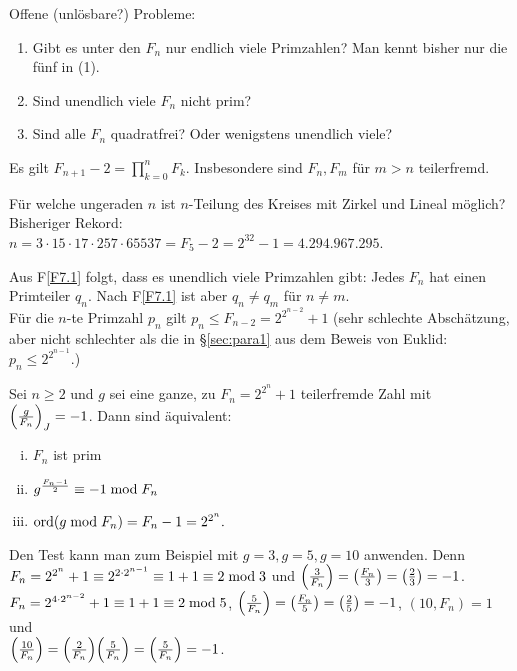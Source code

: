 Offene (unlösbare?) Probleme:
\begin{enumerate}[1)]
	\item Gibt es unter den $F_n$ nur endlich viele Primzahlen? Man kennt bisher nur die fünf in (1).
	\item Sind unendlich viele $F_n$ nicht prim?
	\item Sind alle $F_n$ quadratfrei? Oder wenigstens unendlich viele?
\end{enumerate}

\begin{falko} \label{F7.1}
	Es gilt $F_{n+1} - 2 = \prod_{k=0}^{n} F_k$. Insbesondere sind $F_n,F_m$ für $m > n$ teilerfremd.
\end{falko}

Für welche ungeraden $n$ ist $n$-Teilung des Kreises mit Zirkel und Lineal möglich? Bisheriger Rekord:\\
$n = 3 \cdot 15 \cdot 17 \cdot 257 \cdot 65537 = F_5 - 2 = 2^{32} - 1 = 4.294.967.295$.

	Aus F\ref{F7.1} folgt, dass es unendlich viele Primzahlen gibt: Jedes $F_n$ hat einen Primteiler $q_n$. Nach F\ref{F7.1} ist aber $q_n \neq q_m$ für $n \neq m$. \\
	Für die $n$-te Primzahl $p_n$ gilt $p_n \leq F_{n-2} = 2^{2^{n-2}}+1$ (sehr schlechte Abschätzung, aber nicht schlechter als die in §\ref{sec:para1} aus dem Beweis von Euklid: $p_n \leq 2^{2^{n-1}}$.)
	
\begin{falko} \label{F7.2}
	Sei $n \geq 2$ und $g$ sei eine ganze, zu $F_n = 2^{2^n} + 1$ teilerfremde Zahl mit $\left(\frac{g}{F_n}\right)_J = -1$. Dann sind äquivalent: \begin{enumerate}[(i)]
		\item $F_n$ ist prim 
		\item $g^{\frac{F_n-1}{2}} \equiv -1 \bmod F_n$
		\item $\operatorname{ord}(g \bmod F_n) = F_n - 1 = 2^{2^n}.$
	\end{enumerate}
\end{falko}

	Den Test kann man zum Beispiel mit $g = 3, g= 5, g=10$ anwenden. Denn $F_n = 2^{2^n} + 1 \equiv 2^{2 \cdot 2^{n-1}} \equiv 1 + 1 \equiv 2 \bmod 3$ und $\left(\frac{3}{F_n}\right) = \left(\frac{F_n}{3}\right) = \left(\frac{2}{3}\right) = -1$. \\
	$F_n = 2^{4 \cdot 2^{n-2}} + 1 \equiv 1 + 1 \equiv 2 \bmod 5$, $\left(\frac{5}{F_n}\right) = \left(\frac{F_n}{5}\right) = \left(\frac{2}{5}\right) = -1$, $(10, F_n) = 1$ und \\ $\leg{10}{F_n} = \leg{2}{F_n} \leg{5}{F_n} = \leg{5}{F_n} = -1$.

